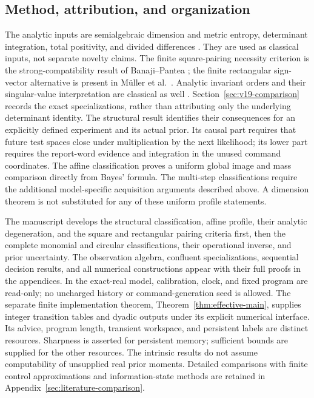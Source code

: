 \subsection{Method, attribution, and organization}
The analytic inputs are semialgebraic dimension and metric entropy,
determinant integration, total positivity, and divided differences
\cite{BochnakCosteRoy,ForresterAndreief,Pinkus,deBoor,
YomdinComte,ZhangKileel,ComteHalupczok}. They are used as classical
inputs, not separate novelty claims. The finite square-pairing
necessity criterion is the strong-compatibility result of
Banaji--Pantea \cite{BanajiPantea2016}; the finite rectangular
sign-vector alternative is present in M\"uller et al.\
\cite{MullerEtAl2016}. Analytic invariant orders and their
singular-value interpretation are classical as well
\cite{KavehMakhnatch}. Section~\ref{sec:v19-comparison}
records the exact specializations, rather than attributing only the
underlying determinant identity. The structural result identifies
their consequences for an explicitly defined experiment and its actual
prior. Its causal part requires that future test spaces close under
multiplication by the next likelihood; its lower part requires the
report-word evidence and integration in the unused command coordinates.
The affine classification proves a uniform global image and mass
comparison directly from Bayes' formula. The multi-step classifications
require the additional model-specific acquisition arguments described
above. A dimension theorem is not substituted for any of these uniform
profile statements.

The manuscript develops the structural classification, affine profile,
their analytic degeneration, and the square and rectangular pairing
criteria first, then the complete monomial and
circular classifications, their operational inverse, and prior
uncertainty. The observation algebra, confluent specializations,
sequential decision results, and all numerical constructions appear
with their full proofs in the appendices. In the exact-real model,
calibration, clock, and fixed program are read-only; no uncharged
history or command-generation seed is allowed. The separate finite
implementation theorem, Theorem~\ref{thm:effective-main}, supplies
integer transition tables and dyadic outputs under its explicit
numerical interface. Its advice, program length, transient workspace,
and persistent labels are distinct resources. Sharpness is asserted
for persistent memory; sufficient bounds are supplied for the other
resources. The intrinsic results do not assume computability of
unsupplied real prior moments. Detailed comparisons with finite
control approximations and information-state methods are retained in
Appendix~\ref{sec:literature-comparison}.

